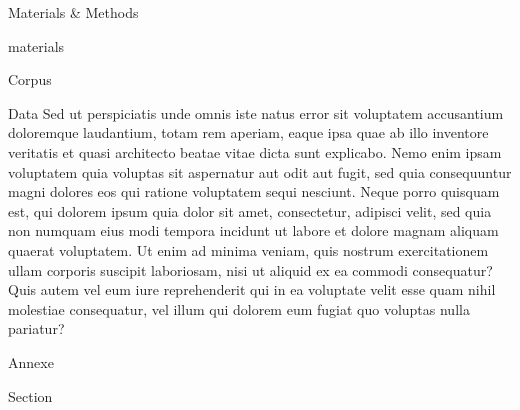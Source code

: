 \documentclass{article}
\begin{document}
\begin{mychapter}{Materials \& Methods}
\begin{mysection}{materials}
\begin{mysubsection}{Corpus}
	\end{mysubsection}
	\begin{mysubsection}{Data}
		Sed ut perspiciatis unde omnis iste natus error sit voluptatem accusantium doloremque laudantium, totam rem aperiam, eaque ipsa quae ab illo inventore veritatis et quasi architecto beatae vitae dicta sunt explicabo. Nemo enim ipsam voluptatem quia voluptas sit aspernatur aut odit aut fugit, sed quia consequuntur magni dolores eos qui ratione voluptatem sequi nesciunt. Neque porro quisquam est, qui dolorem ipsum quia dolor sit amet, consectetur, adipisci velit, sed quia non numquam eius modi tempora incidunt ut labore et dolore magnam aliquam quaerat voluptatem. Ut enim ad minima veniam, quis nostrum exercitationem ullam corporis suscipit laboriosam, nisi ut aliquid ex ea commodi consequatur? Quis autem vel eum iure reprehenderit qui in ea voluptate velit esse quam nihil molestiae consequatur, vel illum qui dolorem eum fugiat quo voluptas nulla pariatur?
	\end{mysubsection}
	\end{mysection}
 
	\end{mychapter}
	


	
%	
%	
%	





	\myappendix
	\begin{mychapter+}{Annexe}
	
	\begin{mysection+}{Section}
	\end{mysection+}
	
	\end{mychapter+}

\myglossary


\mybiblio
\end{document}
